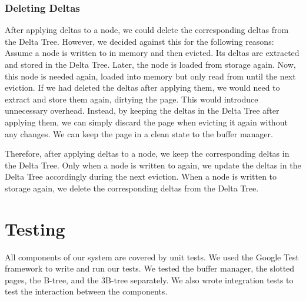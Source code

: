 \subsubsection*{Deleting Deltas}
After applying deltas to a node, we could delete the corresponding deltas from the Delta Tree.
However, we decided against this for the following reasons:
Assume a node is written to in memory and then evicted. 
Its deltas are extracted and stored in the Delta Tree.
Later, the node is loaded from storage again.
Now, this node is needed again, loaded into memory but only read from until the next eviction.
If we had deleted the deltas after applying them, we would need to extract and store them again, dirtying the page.
This would introduce unnecessary overhead.
Instead, by keeping the deltas in the Delta Tree after applying them, we can simply discard the page when evicting it again without any changes.
We can keep the page in a clean state to the buffer manager.

Therefore, after applying deltas to a node, we keep the corresponding deltas in the Delta Tree.
Only when a node is written to again, we update the deltas in the Delta Tree accordingly during the next eviction.
When a node is written to storage again, we delete the corresponding deltas from the Delta Tree.

\section{Testing}
All components of our system are covered by unit tests.
We used the Google Test framework to write and run our tests.
We tested the buffer manager, the slotted pages, the B-tree, and the 3B-tree separately.
We also wrote integration tests to test the interaction between the components.




